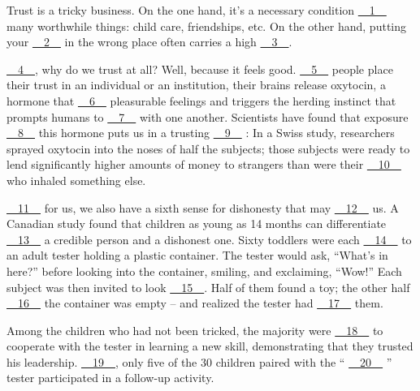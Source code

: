 Trust is a tricky business. On the one hand, it's a necessary condition \uline{~~1~~} many worthwhile things: child care, friendships, etc. On the other hand, putting your \uline{~~2~~} in the wrong place often carries a high \uline{~~3~~}.


\uline{~~4~~}, why do we trust at all? Well, because it feels good. \uline{~~5~~} people place their trust in an individual or an institution, their brains release oxytocin, a hormone that \uline{~~6~~} pleasurable feelings and triggers the herding instinct that prompts  humans to \uline{~~7~~} with one another. Scientists have found that exposure \uline{~~8~~} this  hormone puts us in a trusting \uline{~~9~~} : In a Swiss study, researchers sprayed oxytocin into the noses of half the subjects; those subjects were ready to lend significantly higher amounts of money to strangers than were their \uline{~~10~~} who inhaled something else.


\uline{~~11~~} for us, we also have a sixth sense for dishonesty that may \uline{~~12~~} us. A Canadian study found that children as young as 14 months can differentiate \uline{~~13~~} a credible person and a dishonest one. Sixty toddlers were each \uline{~~14~~} to an adult  tester holding a plastic container. The tester would ask, ``What's in here?'' before looking into the container, smiling, and exclaiming, ``Wow!'' Each subject was then invited to look \uline{~~15~~}. Half of them found a toy; the other half \uline{~~16~~} the  container was empty – and realized the tester had \uline{~~17~~} them.


Among the children who had not been tricked, the majority were \uline{~~18~~} to cooperate with the tester in learning a new skill, demonstrating that they trusted his leadership. \uline{~~19~~}, only five of the 30 children paired with the `` \uline{~~20~~} '' tester participated in a follow-up activity.